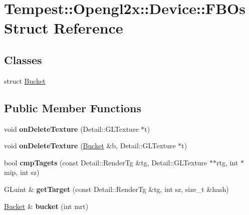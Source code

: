 \hypertarget{struct_tempest_1_1_opengl2x_1_1_device_1_1_f_b_os}{\section{Tempest\+:\+:Opengl2x\+:\+:Device\+:\+:F\+B\+Os Struct Reference}
\label{struct_tempest_1_1_opengl2x_1_1_device_1_1_f_b_os}
}
\subsection*{Classes}
\begin{DoxyCompactItemize}
\item 
struct \hyperlink{struct_tempest_1_1_opengl2x_1_1_device_1_1_f_b_os_1_1_bucket}{Bucket}
\end{DoxyCompactItemize}
\subsection*{Public Member Functions}
\begin{DoxyCompactItemize}
\item 
\hypertarget{struct_tempest_1_1_opengl2x_1_1_device_1_1_f_b_os_a8832819ef5c4c42360de90cef82bb9c4}{void {\bfseries on\+Delete\+Texture} (Detail\+::\+G\+L\+Texture $\ast$t)}\label{struct_tempest_1_1_opengl2x_1_1_device_1_1_f_b_os_a8832819ef5c4c42360de90cef82bb9c4}

\item 
\hypertarget{struct_tempest_1_1_opengl2x_1_1_device_1_1_f_b_os_a97f57cfd78d6b94135f138e343ca9727}{void {\bfseries on\+Delete\+Texture} (\hyperlink{struct_tempest_1_1_opengl2x_1_1_device_1_1_f_b_os_1_1_bucket}{Bucket} \&b, Detail\+::\+G\+L\+Texture $\ast$t)}\label{struct_tempest_1_1_opengl2x_1_1_device_1_1_f_b_os_a97f57cfd78d6b94135f138e343ca9727}

\item 
\hypertarget{struct_tempest_1_1_opengl2x_1_1_device_1_1_f_b_os_a418f24c79cecb60aaebd66a1c75d0642}{bool {\bfseries cmp\+Tagets} (const Detail\+::\+Render\+Tg \&tg, Detail\+::\+G\+L\+Texture $\ast$$\ast$rtg, int $\ast$mip, int sz)}\label{struct_tempest_1_1_opengl2x_1_1_device_1_1_f_b_os_a418f24c79cecb60aaebd66a1c75d0642}

\item 
\hypertarget{struct_tempest_1_1_opengl2x_1_1_device_1_1_f_b_os_ae97727dcb94e0659f0056291ee0aa3ce}{G\+Luint \& {\bfseries get\+Target} (const Detail\+::\+Render\+Tg \&tg, int sz, size\+\_\+t \&hash)}\label{struct_tempest_1_1_opengl2x_1_1_device_1_1_f_b_os_ae97727dcb94e0659f0056291ee0aa3ce}

\item 
\hypertarget{struct_tempest_1_1_opengl2x_1_1_device_1_1_f_b_os_ac8aea39ba3cb4d7af7c0c2008548da7d}{\hyperlink{struct_tempest_1_1_opengl2x_1_1_device_1_1_f_b_os_1_1_bucket}{Bucket} \& {\bfseries bucket} (int mrt)}\label{struct_tempest_1_1_opengl2x_1_1_device_1_1_f_b_os_ac8aea39ba3cb4d7af7c0c2008548da7d}

\end{DoxyCompactItemize}

